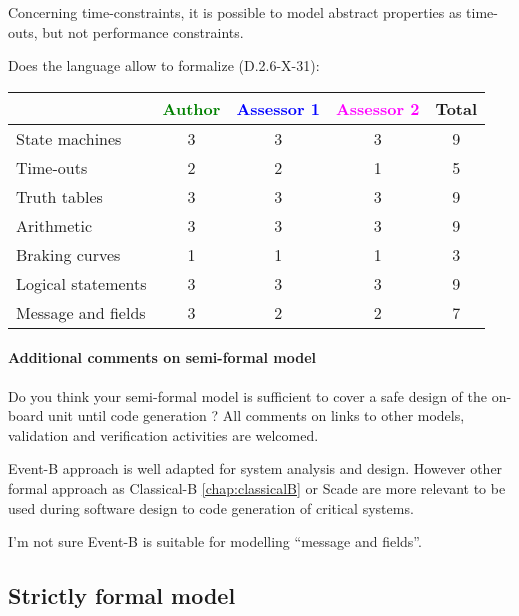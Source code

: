 \begin{author_comment}
Concerning time-constraints, it is possible to  model  abstract properties as time-outs, but not performance constraints.
\end{author_comment}


Does the language allow to  formalize (D.2.6-X-31):

\begin{tabular}{|l | c | c | c | c|}
\hline
& \textcolor{green}{Author} & \textcolor{blue}{Assessor 1} & \textcolor{magenta}{Assessor 2} & Total \\
\hline 
State machines  & 3 & 3 & 3 & 9 \\
\hline
Time-outs  & 2 & 2 & 1 & 5 \\
\hline
Truth tables  & 3 & 3 & 3 & 9 \\
\hline
Arithmetic  & 3 & 3 & 3 & 9 \\
\hline
Braking curves  & 1 & 1 & 1 & 3 \\
\hline
Logical statements & 3 & 3 & 3 & 9 \\
\hline
Message and fields & 3 & 2 & 2 & 7 \\
\hline
\end{tabular}

\paragraph{Additional comments on semi-formal  model} Do you think your semi-formal  model is sufficient to cover a safe design of the on-board unit until code generation ?
All comments on links to  other models, validation and verification activities are welcomed.


\begin{author_comment}
Event-B  approach is well adapted for system analysis and design. However other formal approach as Classical-B \ref{chap:classicalB} or Scade are more relevant to be used during software design to code generation of critical systems.
\end{author_comment}


\begin{assessor1}
I'm not sure Event-B is suitable for modelling ``message and fields''.
\end{assessor1}


\subsection{Strictly formal model}

